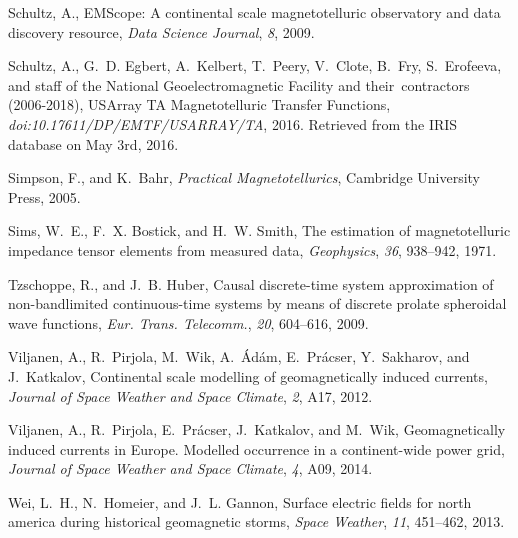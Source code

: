 \documentclass[linenumbers,draft]{agujournal}
\begin{document}
\begin{thebibliography}{27}
Schultz, A., {EMScope}: A continental scale magnetotelluric observatory and
  data discovery resource, {\it Data Science Journal\/}, {\it 8\/}, 2009.

Schultz, A., G.~D. Egbert, A.~Kelbert, T.~Peery, V.~Clote, B.~Fry, S.~Erofeeva,
  and staff of the National Geoelectromagnetic Facility {and} their~contractors
  (2006-2018), {USArray TA Magnetotelluric Transfer Functions}, {\it
  doi:10.17611/DP/EMTF/USARRAY/TA\/}, 2016. Retrieved from the IRIS database on
  May 3rd, 2016.

{Simpson}, F., and K.~{Bahr}, {\it {Practical Magnetotellurics}\/}, Cambridge
  University Press, 2005.

Sims, W.~E., F.~X. Bostick, and H.~W. Smith, The estimation of magnetotelluric
  impedance tensor elements from measured data, {\it Geophysics\/}, {\it 36\/},
  938--942, 1971.

Tzschoppe, R., and J.~B. Huber, Causal discrete-time system approximation of
  non-bandlimited continuous-time systems by means of discrete prolate
  spheroidal wave functions, {\it Eur. Trans. Telecomm.\/}, {\it 20\/},
  604--616, 2009.

{Viljanen}, A., R.~{Pirjola}, M.~{Wik}, A.~{{\'A}d{\'a}m}, E.~{Pr{\'a}cser},
  Y.~{Sakharov}, and J.~{Katkalov}, {Continental scale modelling of
  geomagnetically induced currents}, {\it Journal of Space Weather and Space
  Climate\/}, {\it 2\/}, A17, 2012.

{Viljanen}, A., R.~{Pirjola}, E.~{Pr{\'a}cser}, J.~{Katkalov}, and M.~{Wik},
  {Geomagnetically induced currents in Europe. Modelled occurrence in a
  continent-wide power grid}, {\it Journal of Space Weather and Space
  Climate\/}, {\it 4\/}, A09, 2014.

Wei, L.~H., N.~Homeier, and J.~L. Gannon, Surface electric fields for north
  america during historical geomagnetic storms, {\it Space Weather\/}, {\it
  11\/}, 451--462, 2013.

\end{thebibliography}
\end{document}
